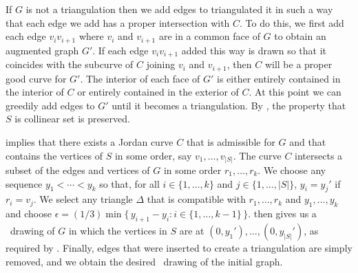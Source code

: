 If $G$ is not a triangulation then we add edges to triangulated it in
such a way that each edge we add has a proper intersection with $C$.
To do this, we first add each edge $v_iv_{i+1}$ where $v_i$ and $v_{i+1}$
are in a common face of $G$ to obtain an augmented graph $G'$. If each
edge $v_iv_{i+1}$ added this way is drawn so that it coincides with
the subcurve of $C$ joining $v_i$ and $v_{i+1}$, then $C$ will be a
proper good curve for $G'$.  The interior of each face of $G'$ is either
entirely contained in the interior of $C$ or entirely contained in the
exterior of $C$. At this point we can greedily add edges to $G'$ until
it becomes a triangulation.  By , the property
that $S$ is collinear set is  preserved.

  implies
	that there exists a Jordan curve $C$ that is admissible for $G$
	and that contains the vertices of $S$ in some order, say
	$v_1,\ldots,v_{|S|}$.  The curve $C$ intersects a subset of the edges
	and vertices of $G$ in some order $r_1,\ldots,r_k$.  We choose any
	sequence $y_1<\cdots<y_k$ so that, for all $i\in\{1,\ldots,k\}$ and
	$j\in\{1,\ldots,|S|\}$, $y_i = y_j'$ if $r_i=v_j$.  We select
	any triangle $\Delta$ that is compatible with $r_1,\ldots,r_k$ and
	$y_1,\ldots,y_k$ and choose $\epsilon = (1/3)\min\{\,y_{i+1}-y_{i}:
	i\in\{1,\ldots,k-1\}\,\}$.   then gives us a \Fary\
	drawing of $G$ in which the vertices in $S$ are at
        $(0,y_1'),\ldots,(0,y_{|S|}')$, as required by
        .
Finally, edges that were inserted to create a triangulation are simply removed, and we obtain the desired \Fary\ drawing of the initial graph.



